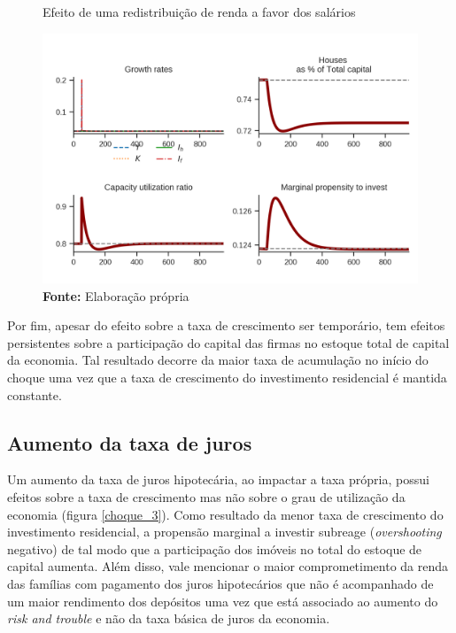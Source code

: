 \begin{figure}[htb]
	\centering
	\caption{Efeito de uma redistribuição de renda a favor dos salários}
	\label{choque_2}
	\includegraphics{../../Modelo/Versoes/Shock_2.png}
	\caption*{\textbf{Fonte:} Elaboração própria}
\end{figure}

Por fim, apesar do efeito sobre a taxa de crescimento ser temporário, tem efeitos persistentes sobre a participação do capital das firmas no estoque total de capital da economia. Tal resultado decorre da maior taxa de acumulação no início do choque uma vez que a taxa de crescimento do investimento residencial é mantida constante. 

\subsection*{Aumento da taxa de juros}

Um aumento da taxa de juros hipotecária, ao impactar a taxa própria, possui efeitos sobre a taxa de crescimento mas não sobre o grau de utilização da economia (figura \ref{choque_3}). Como resultado da menor taxa de crescimento do investimento residencial, a propensão marginal a investir subreage (\textit{overshooting} negativo) de tal modo que a participação dos imóveis no total do estoque de capital aumenta. Além disso, vale mencionar o maior comprometimento da renda das famílias com pagamento dos juros hipotecários que não é acompanhado de um maior rendimento dos depósitos uma vez que está associado ao aumento do \textit{risk and trouble} e não da taxa básica de juros da economia.

